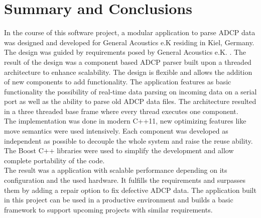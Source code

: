 \chapter{Summary and Conclusions}
In the course of this software project, a modular application to parse ADCP data was designed and developed for General Acoustics e.K residing in Kiel, Germany. The design was guided by requirements posed by General Acoustics e.K. . The result of the design was a component based ADCP parser built upon a threaded architecture to enhance scalability. The design is flexible and allows the addition of new components to add functionality. The application features as basic functionality the possibility of real-time data parsing on incoming data on a serial port as well as the ability to parse old ADCP data files. The architecture resulted in a three threaded base frame where every thread executes one component.\\
The implementation was done in modern C++11, new optimizing features like move semantics were used intensively. Each component was developed as independent as possible to decouple the whole system and raise the reuse ability. The Boost C++ libraries were used to simplify the development and allow complete portability of the code.\\
The result was a application with scalable performance depending on its configuration and the used hardware. It fulfills the requirements and surpasses them by adding a repair option to fix defective ADCP data. The application built in this project can be used in a productive environment and builds a basic framework to support upcoming projects with similar requirements.  
